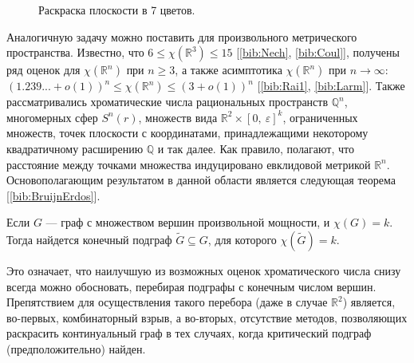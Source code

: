\begin{figure}[h]
\centering
\captionsetup{justification=centering}
\caption{Раскраска плоскости в 7 цветов.}
\label{introduction:fig:plane}
\end{figure}

Аналогичную задачу можно поставить для произвольного метрического пространства. Известно, что 
$6 \leq \chi(\mathbb{R}^3) \leq 15$ [\ref{bib:Nech}, \ref{bib:Coul}], 
получены ряд оценок для $\chi(\mathbb{R}^n)$ при $n \ge 3$, а также асимптотика $\chi(\mathbb{R}^n)$ при $n\to\infty$: 
$(1.239...+o(1))^n\leq \chi(\mathbb{R}^n)\leq (3+o(1))^n$ [\ref{bib:Rai1}, \ref{bib:Larm}].
Также рассматривались хроматические числа рациональных пространств $\mathbb{Q}^n$, многомерных сфер $S^n(r)$, 
множеств вида $\mathbb{R}^2 \times \left[ 0,~\varepsilon \right]^{k}$, ограниченных множеств, точек плоскости с координатами, принадлежащими некоторому квадратичному расширению $\mathbb{Q}$ и так далее. Как правило, полагают, что расстояние между точками множества индуцировано евклидовой метрикой $\mathbb{R}^n$. Основополагающим результатом в данной области является следующая теорема [\ref{bib:BruijnErdos}].


\begin{theorem1}
Если $G$ — граф с множеством вершин произвольной мощности, и $\chi(G) = k$. Тогда найдется конечный подграф  $\widetilde{G} \subseteq G$, для которого $\chi(\widetilde{G}) = k$. 
\end{theorem1}

Это означает, что наилучшую из возможных оценок хроматического числа снизу всегда можно обосновать, перебирая подграфы с конечным числом вершин. Препятствием для осуществления такого перебора (даже в случае $\mathbb{R}^2$) является, во-первых, комбинаторный взрыв, а во-вторых, отсутствие методов, позволяющих раскрасить континуальный граф в тех случаях, когда критический подграф (предположительно) найден.

